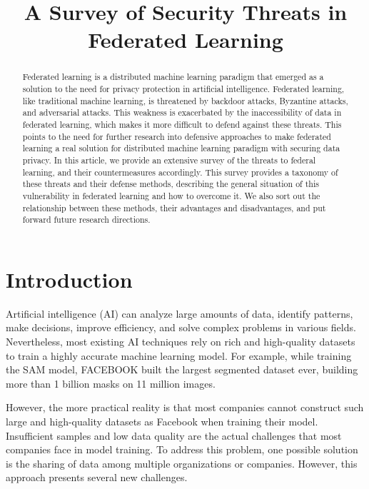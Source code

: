 \documentclass[conference]{IEEEtran}
\begin{document}
\title{A Survey of Security Threats in Federated Learning}


\maketitle

\begin{abstract}
Federated learning is a distributed machine learning paradigm that emerged as a solution to the need for privacy protection in artificial intelligence. 
Federated learning, like traditional machine learning, is threatened by backdoor attacks, Byzantine attacks, and adversarial attacks. 
This weakness is exacerbated by the inaccessibility of data in federated learning, 
which makes it more difficult to defend against these threats.
This points to the need for further research into defensive approaches to make federated learning a real solution for distributed machine learning paradigm with securing data privacy.
In this article, we provide an extensive survey of the threats to federal learning, 
and their countermeasures accordingly. 
This survey provides a taxonomy of these threats and their defense methods, 
describing the general situation of this vulnerability in federated learning and how to overcome it. 
We also sort out the relationship between these methods, their advantages and disadvantages, and put forward future research directions.
\end{abstract}



\section{Introduction}
Artificial intelligence (AI) can analyze large amounts of data, 
identify patterns, make decisions, improve efficiency, and solve complex problems 
in various fields.
Nevertheless, most existing AI techniques rely on rich and high-quality 
datasets to train a highly accurate machine learning model.
For example, while training the SAM model, 
FACEBOOK \cite{b1}  built the largest segmented dataset ever, 
building more than 1 billion masks on 11 million images.

However, the more practical reality is that most companies cannot 
construct such large and high-quality datasets as Facebook 
when training their model. 
Insufficient samples and low data quality are the actual challenges 
that most companies face in model training. 
To address this problem, one possible solution 
is the sharing of data among multiple organizations or companies. 
However, this approach presents several new challenges.
\end{document}
